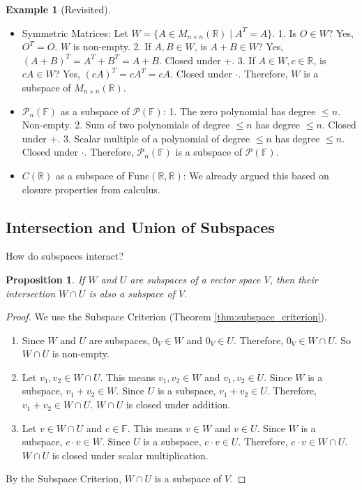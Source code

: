 \documentclass[11pt]{article}
\newtheorem{proposition}[theorem]{Proposition}
\theoremstyle{definition}
\newtheorem{example}[theorem]{Example}
\theoremstyle{remark}
\newcommand{\R}{\mathbb{R}}
\newcommand{\F}{\mathbb{F}} %
\newcommand{\Mat}[3]{M_{#1 \times #2}(#3)}
\newcommand{\Poly}[1]{\mathcal{P}(#1)}
\newcommand{\PolyN}[2]{\mathcal{P}_{#1}(#2)}
\newcommand{\Func}[2]{\mathrm{Func}(#1, #2)}
\begin{document}
\begin{example}[Revisited]
\begin{itemize}
    \item Symmetric Matrices: Let $W = \{ A \in \Mat{n}{n}{\R} \mid A^T = A \}$.
        1. Is $O \in W$? Yes, $O^T = O$. $W$ is non-empty.
        2. If $A, B \in W$, is $A+B \in W$? Yes, $(A+B)^T = A^T + B^T = A+B$. Closed under +.
        3. If $A \in W, c \in \R$, is $cA \in W$? Yes, $(cA)^T = c A^T = cA$. Closed under $\cdot$.
        Therefore, $W$ is a subspace of $\Mat{n}{n}{\R}$.
    \item $\PolyN{n}{\F}$ as a subspace of $\Poly{\F}$:
        1. The zero polynomial has degree $\le n$. Non-empty.
        2. Sum of two polynomials of degree $\le n$ has degree $\le n$. Closed under +.
        3. Scalar multiple of a polynomial of degree $\le n$ has degree $\le n$. Closed under $\cdot$.
        Therefore, $\PolyN{n}{\F}$ is a subspace of $\Poly{\F}$.
    \item $C(\R)$ as a subspace of $\Func{\R}{\R}$: We already argued this based on closure properties from calculus.
\end{itemize}
\end{example}

\subsection{Intersection and Union of Subspaces}

How do subspaces interact?
\begin{proposition}
If $W$ and $U$ are subspaces of a vector space $V$, then their intersection $W \cap U$ is also a subspace of $V$.
\end{proposition}

\begin{proof}
We use the Subspace Criterion (Theorem \ref{thm:subspace_criterion}).
\begin{enumerate}
    \item Since $W$ and $U$ are subspaces, $0_V \in W$ and $0_V \in U$. Therefore, $0_V \in W \cap U$. So $W \cap U$ is non-empty.
    \item Let $v_1, v_2 \in W \cap U$. This means $v_1, v_2 \in W$ and $v_1, v_2 \in U$.
        Since $W$ is a subspace, $v_1 + v_2 \in W$.
        Since $U$ is a subspace, $v_1 + v_2 \in U$.
        Therefore, $v_1 + v_2 \in W \cap U$. $W \cap U$ is closed under addition.
    \item Let $v \in W \cap U$ and $c \in \F$. This means $v \in W$ and $v \in U$.
        Since $W$ is a subspace, $c \cdot v \in W$.
        Since $U$ is a subspace, $c \cdot v \in U$.
        Therefore, $c \cdot v \in W \cap U$. $W \cap U$ is closed under scalar multiplication.
\end{enumerate}
By the Subspace Criterion, $W \cap U$ is a subspace of $V$.
\end{proof}
\end{document}
